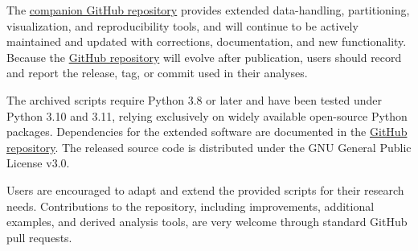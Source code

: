 \documentclass[11pt]{article}
\begin{document}
The \href{https://github.com/UAH-PSI/das-vessel-detection}{companion GitHub repository} provides extended data-handling, partitioning, visualization, and reproducibility tools, and will continue to be actively maintained and updated with corrections, documentation, and new functionality. Because the \href{https://github.com/UAH-PSI/das-vessel-detection}{GitHub repository} will evolve after publication, users should record and report the release, tag, or commit used in their analyses.

The archived scripts require Python 3.8 or later and have been tested under Python 3.10 and 3.11, relying exclusively on widely available open-source Python packages. Dependencies for the extended software are documented in the \href{https://github.com/UAH-PSI/das-vessel-detection}{GitHub repository}. The released source code is distributed under the GNU General Public License v3.0.

Users are encouraged to adapt and extend the provided scripts for their research needs. Contributions to the repository, including improvements, additional examples, and derived analysis tools, are very welcome through standard GitHub pull requests.



\end{document}
